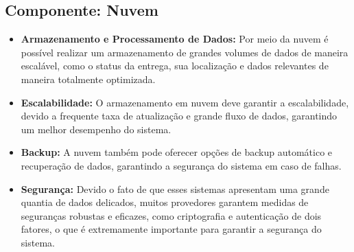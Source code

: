      \subsection{Componente: Nuvem}
     \begin{itemize}
     	\item \textbf{Armazenamento e Processamento de Dados:} Por meio da nuvem é possível realizar um armazenamento de grandes volumes de dados de maneira escalável, como o status da entrega, sua localização e dados relevantes de maneira totalmente optimizada.
     	
     	\item \textbf{Escalabilidade:} O armazenamento em nuvem deve garantir a escalabilidade, devido a frequente taxa de atualização e grande fluxo de dados, garantindo um melhor desempenho do sistema.
     	
     	\item \textbf{Backup:} A nuvem também pode oferecer opções de backup automático e recuperação de dados, garantindo a segurança do sistema em caso de falhas.
     	
     	\item \textbf{Segurança:} Devido o fato de que esses sistemas apresentam uma grande quantia de dados delicados, muitos provedores garantem medidas de seguranças robustas e eficazes, como criptografia e autenticação de dois fatores, o que é extremamente importante para garantir a segurança do sistema.
     \end{itemize}



